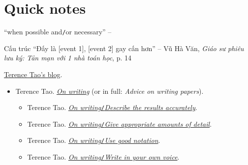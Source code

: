 \documentclass[oneside]{book}
\numberwithin{equation}{section}
\begin{document}

\appendix

\section*{Quick notes}
``when possible and\texttt{/}or necessary'' -- \cite[p. 47]{Rebollo_Lewandowski2014}


Cấu trúc ``Đấy là [event 1], [event 2] gay cấn hơn'' -- Vũ Hà Văn, \textit{Giáo sư phiêu lưu ký: Tản mạn với 1 nhà toán học}, p. 14



\begin{thebibliography}{99}
	 \href{https://terrytao.wordpress.com}{Terence Tao's blog}.
	\begin{itemize}
		\item Terence Tao. \href{https://terrytao.wordpress.com/advice-on-writing-papers/}{\textit{On writing}} (or in full: \textit{Advice on writing papers}).
		\begin{itemize}
			\item Terence Tao. \href{https://terrytao.wordpress.com/advice-on-writing-papers/describe-the-results-accurately/}{\textit{On writing}\texttt{/}\textit{Describe the results accurately}}.
			\item Terence Tao. \href{https://terrytao.wordpress.com/advice-on-writing-papers/give-appropriate-amounts-of-detail/}{\textit{On writing}\texttt{/}\textit{Give appropriate amounts of detail}}.
			\item Terence Tao. \href{https://terrytao.wordpress.com/advice-on-writing-papers/use-good-notation/}{\textit{On writing}\texttt{/}\textit{Use good notation}}.
			\item Terence Tao. \href{https://terrytao.wordpress.com/advice-on-writing-papers/write-in-your-own-voice/}{\textit{On writing}\texttt{/}\textit{Write in your own voice}}.
		\end{itemize}
	\end{itemize}
\end{thebibliography}


\printbibliography[heading=bibintoc]
	
\end{document}

